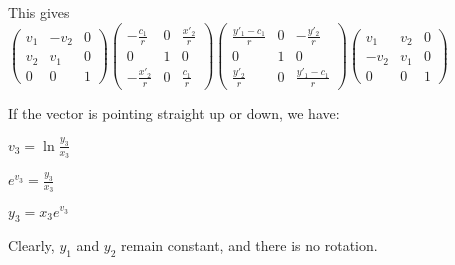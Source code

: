 \documentclass[12pt]{amsart}
\newcommand{\ignore}[1]{}
\newcommand{\matc}[9]{\left(\begin{array}{ccc} #1 & #2 & #3 \\#4 & #5 & #6 \\#7 & #8 & #9 \end{array} \right)}
\begin{document}
This gives $\matc{v_1}{-v_2}{0}{v_2}{v_1}{0}{0}{0}{1} \matc{-\frac{c_1}{r}}{0}{\frac{x'_2}{r}}{0}{1}{0}{-\frac{x'_2}{r}}{0}{\frac{c_1}{r}} \matc{\frac{y'_1-c_1}{r}}{0}{-\frac{y'_2}{r}}{0}{1}{0}{\frac{y'_2}{r}}{0}{\frac{y'_1-c_1}{r}} \matc{v_1}{v_2}{0}{-v_2}{v_1}{0}{0}{0}{1}$

If the vector is pointing straight up or down, we have:

$v_3 = \ln\frac{y_3}{x_3}$

$e^{v_3} = \frac{y_3}{x_3}$

$y_3 = x_3e^{v_3}$

Clearly, $y_1$ and $y_2$ remain constant, and there is no rotation.

\ignore{


$y'_1 = \frac{(ce^{2d} - re^{2d})x_2^2 + c^3 - c^2r - cr^2 + r^3}{x_2^2e^{2d} + c^2 - 2cr + r^2}$

$= \frac{(c - r)x_2^2e^{2d} + (c-r)^2(c+r)}{x_2^2e^{2d} + (c-r)^2}$
}
\end{document}
